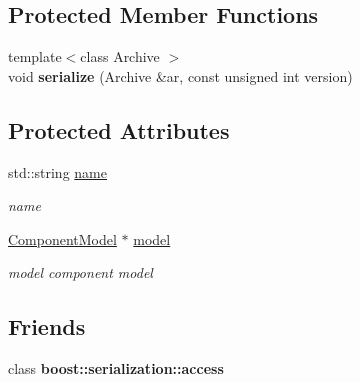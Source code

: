 \subsection*{Protected Member Functions}
\begin{DoxyCompactItemize}
\item 
{\footnotesize template$<$class Archive $>$ }\\void {\bfseries serialize} (Archive \&ar, const unsigned int version)\hypertarget{class_net_component_af55f6a28639ad956b41a21e73e16f445}{}\label{class_net_component_af55f6a28639ad956b41a21e73e16f445}

\end{DoxyCompactItemize}
\subsection*{Protected Attributes}
\begin{DoxyCompactItemize}
\item 
std\+::string \hyperlink{class_net_component_aa1fd04ed705210806544993b51fffb0f}{name}\hypertarget{class_net_component_aa1fd04ed705210806544993b51fffb0f}{}\label{class_net_component_aa1fd04ed705210806544993b51fffb0f}

\begin{DoxyCompactList}\small\item\em name \end{DoxyCompactList}\item 
\hyperlink{class_component_model}{Component\+Model} $\ast$ \hyperlink{class_net_component_a7fec3d6449003b423d617529e337a7f5}{model}\hypertarget{class_net_component_a7fec3d6449003b423d617529e337a7f5}{}\label{class_net_component_a7fec3d6449003b423d617529e337a7f5}

\begin{DoxyCompactList}\small\item\em model component model \end{DoxyCompactList}\end{DoxyCompactItemize}
\subsection*{Friends}
\begin{DoxyCompactItemize}
\item 
class {\bfseries boost\+::serialization\+::access}\hypertarget{class_net_component_ac98d07dd8f7b70e16ccb9a01abf56b9c}{}\label{class_net_component_ac98d07dd8f7b70e16ccb9a01abf56b9c}

\end{DoxyCompactItemize}


